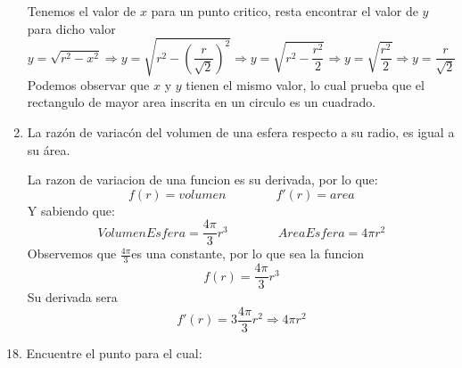 \documentclass[12pt]{article}
\begin{document}
\begin{enumerate}[\hspace{9px} a)]
    Tenemos el valor de \(x\) para un punto critico, resta encontrar el valor de \(y\) para dicho valor
    \[y=\sqrt{r^2-x^2}\Rightarrow y=\sqrt{r^2-(\displaystyle\frac{r}{\sqrt{2}})^2}\Rightarrow y=\sqrt{r^2-\displaystyle\frac{r^2}{2}}\Rightarrow y=\sqrt{\displaystyle\frac{r^2}{2}}\Rightarrow y=\displaystyle\frac{r}{\sqrt{2}}\] 
    Podemos observar que \(x\) y \(y\) tienen el mismo valor, lo cual prueba que el rectangulo de mayor area inscrita en un circulo es un cuadrado.\medskip

    \item La raz\'on de variac\'on del volumen de una esfera respecto a su radio, es igual a su \'area.\medskip
    
    La razon de variacion de una funcion es su derivada, por lo que: 
    \[f(r)=volumen \qquad \qquad f'(r)=area\]
    Y sabiendo que:
    \[Volumen Esfera=\displaystyle\frac{4\pi}{3}r^3\qquad \qquad Area Esfera=4\pi r^2\]
    Observemos que \(\displaystyle\frac{4\pi}{3}\)es una constante, por lo que sea la funcion
    \[f(r)=\displaystyle\frac{4\pi}{3}r^3\]
    Su derivada sera
    \[f'(r)=3\displaystyle\frac{4\pi}{3}r^2\Rightarrow 4\pi r^2\]
\end{enumerate}

18. Encuentre el punto para el cual:
\end{document}
